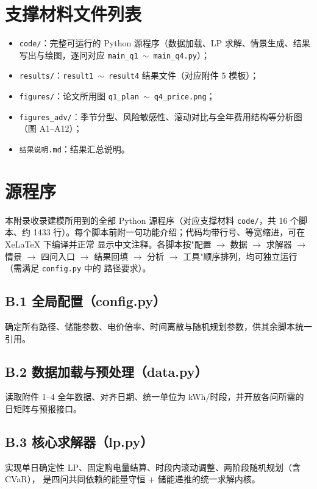\documentclass[withoutpreface]{cumcmthesis}
\begin{document}
\begin{appendices}

\section{支撑材料文件列表}
\begin{itemize}
    \item \texttt{code/}：完整可运行的 Python 源程序（数据加载、LP 求解、情景生成、结果
          写出与绘图，逐问对应 \texttt{main\_q1}~$\sim$~\texttt{main\_q4.py}）；
    \item \texttt{results/}：\texttt{result1}~$\sim$~\texttt{result4} 结果文件（对应附件 5 模板）；
    \item \texttt{figures/}：论文所用图 \texttt{q1\_plan}~$\sim$~\texttt{q4\_price.png}；
    \item \texttt{figures\_adv/}：季节分型、风险敏感性、滚动对比与全年费用结构等分析图（图 A1--A12）；
    \item \texttt{结果说明.md}：结果汇总说明。
\end{itemize}

\section{源程序}
本附录收录建模所用到的全部 Python 源程序（对应支撑材料 \texttt{code/}，共 16 个脚本、约
1433 行）。每个脚本前附一句功能介绍；代码均带行号、等宽缩进，可在 XeLaTeX 下编译并正常
显示中文注释。各脚本按"配置 $\rightarrow$ 数据 $\rightarrow$ 求解器 $\rightarrow$ 情景 $\rightarrow$ 四问入口
$\rightarrow$ 结果回填 $\rightarrow$ 分析 $\rightarrow$ 工具"顺序排列，均可独立运行（需满足 \texttt{config.py} 中的
路径要求）。

\subsection{B.1 全局配置（config.py）}\label{app:config}
确定所有路径、储能参数、电价倍率、时间离散与随机规划参数，供其余脚本统一引用。


\subsection{B.2 数据加载与预处理（data.py）}\label{app:data}
读取附件 1--4 全年数据、对齐日期、统一单位为 kWh/时段，并开放各问所需的日矩阵与预报接口。


\subsection{B.3 核心求解器（lp.py）}\label{app:lp}
实现单日确定性 LP、固定购电量结算、时段内滚动调整、两阶段随机规划（含 CVaR），
是四问共同依赖的能量守恒 + 储能递推的统一求解内核。



\end{appendices}
\end{document}
